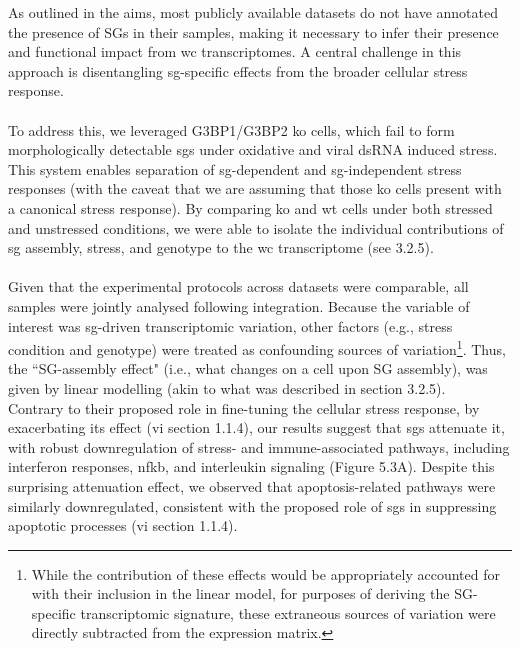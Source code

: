 As outlined in the aims, most publicly available datasets do not have annotated the presence of SGs in their samples, making it necessary to infer their presence and functional impact from \gls{wc} transcriptomes. A central challenge in this approach is disentangling \gls{sg}-specific effects from the broader cellular stress response.
\\
\\
To address this, we leveraged G3BP1/G3BP2 \gls{ko} cells, which fail to form morphologically detectable \glspl{sg} under oxidative and viral dsRNA induced stress\cite{matheny_transcriptome-wide_2019, matheny_rna_2021, matheny_corrigendum_2023, paget_stress_2023}. This system enables separation of \gls{sg}-dependent and \gls{sg}-independent stress responses (with the caveat that we are assuming that those \gls{ko} cells present with a canonical stress response). By comparing \gls{ko} and \gls{wt} cells under both stressed and unstressed conditions, we were able to isolate the individual contributions of \gls{sg} assembly, stress, and genotype to the \gls{wc} transcriptome (see 3.2.5)\cite{matheny_transcriptome-wide_2019, matheny_rna_2021, matheny_corrigendum_2023, paget_stress_2023}.
\\
\\
Given that the experimental protocols across datasets were comparable, all samples were jointly analysed following integration. Because the variable of interest was \gls{sg}-driven transcriptomic variation, other factors (e.g., stress condition and genotype) were treated as confounding sources of variation\footnote{While the contribution of these effects would be appropriately accounted for with their inclusion in the linear model, for purposes of deriving the SG-specific transcriptomic signature, these extraneous sources of variation were directly subtracted from the expression matrix.}. Thus, the ``SG-assembly effect" (i.e., what changes on a cell upon SG assembly), was given by linear modelling (akin to what was described in section 3.2.5).
\\
\linebreak
\noindent
Contrary to their proposed role in fine-tuning the cellular stress response, by exacerbating its effect (\gls{vi} section 1.1.4), our results suggest that \glspl{sg} attenuate it, with robust downregulation of stress- and immune-associated pathways, including interferon responses, \gls{nfkb}, and interleukin signaling (Figure 5.3A). Despite this surprising attenuation effect, we observed that apoptosis-related pathways were similarly downregulated, consistent with the proposed role of \glspl{sg} in suppressing apoptotic processes (\gls{vi} section 1.1.4).
